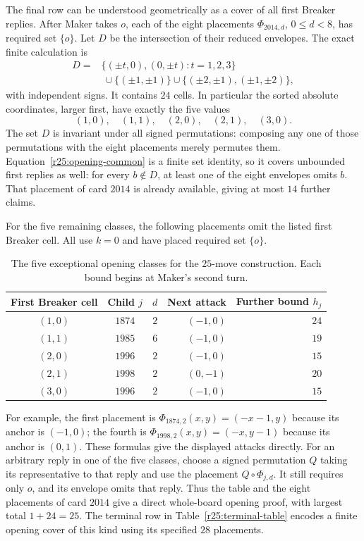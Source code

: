 The final row can be understood geometrically as a cover of all first
Breaker replies.  After Maker takes $o$, each of the eight placements
$\Phi_{2014,d}$, $0\leq d<8$, has required set $\{o\}$.
Let $D$ be the intersection of their reduced envelopes.  The exact
finite calculation is
\begin{equation}\label{r25:opening-common}
 \begin{split}
 D={}&\{(\pm t,0),(0,\pm t):t=1,2,3\}\\
    &\ \cup\{(\pm1,\pm1)\}
      \cup\{(\pm2,\pm1),(\pm1,\pm2)\},
 \end{split}
\end{equation}
with independent signs.  It contains $24$ cells.  In particular
the sorted absolute coordinates, larger first, have exactly the five
values
\[
 (1,0),\quad(1,1),\quad(2,0),\quad(2,1),\quad(3,0).
\]
The set $D$ is invariant under all signed permutations: composing any
one of those permutations with the eight placements merely permutes
them.  Equation~\eqref{r25:opening-common} is a finite set identity,
so it covers unbounded first replies as well: for every $b\notin D$,
at least one of the eight envelopes omits $b$.  That placement of
card $2014$ is already available, giving at most $14$ further claims.

For the five remaining classes, the following placements omit the
listed first Breaker cell.  All use $k=0$ and have placed required
set $\{o\}$.
\begin{table}[htbp]
\centering
\begin{tabular}{cccrr}
\toprule
First Breaker cell&Child $j$&$d$&Next attack&Further bound $h_j$\\
\midrule
$(1,0)$&$1874$&$2$&$(-1,0)$&$24$\\
$(1,1)$&$1985$&$6$&$(-1,0)$&$19$\\
$(2,0)$&$1996$&$2$&$(-1,0)$&$15$\\
$(2,1)$&$1998$&$2$&$(0,-1)$&$20$\\
$(3,0)$&$1996$&$2$&$(-1,0)$&$15$\\
\bottomrule
\end{tabular}
\caption{The five exceptional opening classes for the $25$-move
construction.  Each bound begins at Maker's second turn.}
\label{r25:opening-table}
\end{table}
For example, the first placement is
$\Phi_{1874,2}(x,y)=(-x-1,y)$ because its anchor is $(-1,0)$;
the fourth is $\Phi_{1998,2}(x,y)=(-x,y-1)$ because its anchor is
$(0,1)$.  These formulas give the displayed attacks directly.
For an arbitrary reply in one of the five classes, choose a signed
permutation $Q$ taking its representative to that reply and use the
placement $Q\circ\Phi_{j,d}$.  It still requires only $o$, and its
envelope omits that reply.  Thus the table and the eight placements
of card $2014$ give a direct whole-board opening proof, with largest
total $1+24=25$.  The terminal row in
Table~\ref{r25:terminal-table} encodes a finite opening cover of this
kind using its specified $28$ placements.

